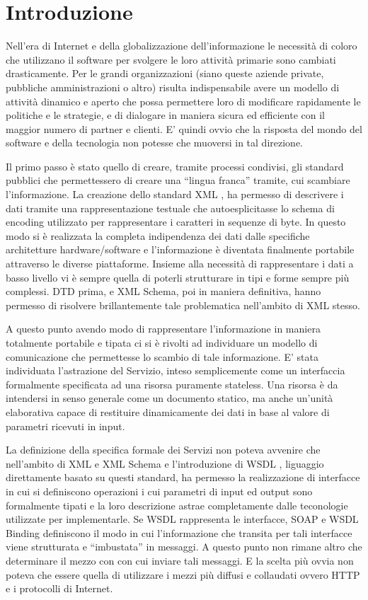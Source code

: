 \chapter{Introduzione}

Nell'era di Internet e della globalizzazione dell'informazione le necessità di
coloro che utilizzano il software per svolgere le loro attività primarie sono
cambiati drasticamente. Per le grandi organizzazioni (siano queste aziende
private, pubbliche amministrazioni o altro) risulta indispensabile avere un
modello di attività dinamico e aperto che possa permettere loro di modificare
rapidamente le politiche e le strategie, e di dialogare in maniera sicura ed
efficiente con il maggior numero di partner e clienti. E' quindi ovvio che la
risposta del mondo del software e della tecnologia non potesse che muoversi in
tal direzione. 

Il primo passo è stato quello di creare, tramite processi condivisi, gli
standard pubblici che permettessero di creare una ``lingua franca'' tramite, cui
scambiare l'informazione. La creazione dello standard XML \cite{XML}, ha permesso di
descrivere i dati tramite una rappresentazione testuale che autoesplicitasse lo schema di
encoding utilizzato per rappresentare i caratteri in sequenze di byte. In questo
modo si è realizzata la completa indipendenza dei dati dalle specifiche
architetture hardware/software e l'informazione è diventata finalmente portabile
attraverso le diverse piattaforme. Insieme alla necessità di rappresentare i dati
a basso livello vi è sempre quella di poterli strutturare in tipi e forme sempre
più complessi. DTD prima, e XML Schema, poi in maniera definitiva, hanno
permesso di risolvere brillantemente tale problematica nell'ambito di XML stesso.

A questo punto avendo modo di rappresentare l'informazione in maniera totalmente
portabile e tipata ci si è rivolti ad individuare un modello di
comunicazione che permettesse lo scambio di tale informazione. E' stata
individuata l'astrazione del Servizio, inteso semplicemente come un interfaccia
formalmente specificata ad una risorsa puramente stateless. Una risorsa è da
intendersi in senso generale come un documento statico, ma anche un'unità
elaborativa capace di restituire dinamicamente dei dati in base al valore
di parametri ricevuti in input.

La definizione della specifica formale dei Servizi non poteva avvenire che
nell'ambito di XML e XML Schema e l'introduzione di WSDL \cite{WSDL}, liguaggio
direttamente basato su questi standard, ha permesso la realizzazione di
interfacce in cui si definiscono operazioni i cui parametri di input ed output
sono formalmente tipati e la loro descrizione astrae completamente dalle
teconologie utilizzate per implementarle. Se WSDL rappresenta le interfacce, SOAP
\cite{SOAP} e WSDL Binding definiscono il modo in cui l'informazione che transita
per tali interfacce viene strutturata e ``imbustata'' in messaggi. A questo
punto non rimane altro che determinare il mezzo con con cui inviare tali
messaggi. E la scelta più ovvia non poteva che essere quella di utilizzare i
mezzi più diffusi e collaudati ovvero HTTP e i protocolli di Internet.


